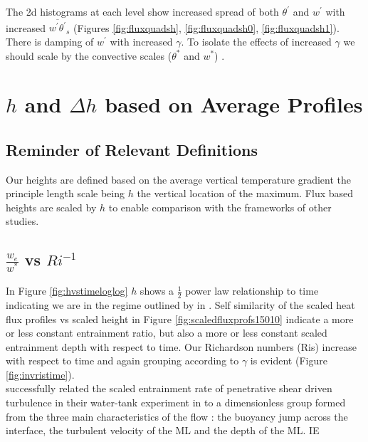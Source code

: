 The 2d histograms at each level show increased spread of both $\theta^{'}$ and $w^{'}$ with increased 
$\overline{w^{'}\theta^{'}}_{s}$ (Figures \ref{fig:fluxquadsh}, \ref{fig:fluxquadsh0}, \ref{fig:fluxquadsh1}).  There is damping of $w^{'}$ with increased $\gamma$.  To isolate the 
effects of increased $\gamma$ we should scale by the convective scales ($\theta^{*}$ and $w^{*}$) .


\section{$h$ and  $\Delta h$ based on Average Profiles}
\label{sec:hdeltahavprofs}
\subsection{Reminder of Relevant Definitions}
\FloatBarrier

Our heights are defined based on the average vertical temperature gradient the principle length scale being $h$ the vertical location of the maximum.  Flux based heights are scaled by $h$ to enable comparison with the frameworks of other studies.  

\subsection{$\frac{w_{e}}{w^{*}}$ vs $Ri^{-1}$}
\FloatBarrier

In Figure \ref{fig:hvstimeloglog} $h$ shows a $\frac{1}{2}$ power law relationship to time indicating we are in the regime outlined by \citeauthor{FedConzMir04} in \cite{FedConzMir04}.  Self similarity of the scaled heat flux profiles vs scaled height in Figure \ref{fig:scaledfluxprofs15010} indicate a more or less constant entrainment ratio, but also a more or less constant scaled entrainment depth with respect to time. Our Richardson numbers (\acs{Ri}s) increase with respect to time and again grouping according to $\gamma$ is evident (Figure \ref{fig:invristime}).\\


\citeauthor{KatoPhil} successfully related
the scaled entrainment rate of penetrative shear driven turbulence
in their water-tank experiment in \cite{KatoPhil}
to a  dimensionless group formed from the three main characteristics
of the flow : the buoyancy jump across the interface, the turbulent velocity of the \acs{ML} and the depth of the \acs{ML}. IE

